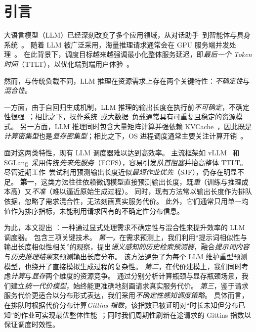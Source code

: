 \section{引言}
\label{sec:intro}

大语言模型（LLM）已经深刻改变了多个应用领域，从对话助手~\cite{openai_chatgpt,deepseek}到智能体与具身系统~\cite{chen2023typefly,wang2024llm}。
随着 LLM 被广泛采用，海量推理请求通常会在 GPU 服务端并发处理~\cite{sun2024llumnix}。
在此背景下，调度目标越来越强调最小化整体服务延迟，即\emph{最后一个 Token 时间}（TTLT），以优化端到端用户体验~\cite{shahout2024don,qiu2024efficient}。

然而，与传统负载不同，LLM 推理在资源需求上存在两个关键特性：\emph{不确定性}与\emph{混合性}。

一方面，由于自回归生成机制，LLM 推理的输出长度在执行前\emph{不可确定}，不确定性很强~\cite{yu2022orca}；相比之下，操作系统~\cite{lozi2016linux}或大数据~\cite{ousterhout2015making}负载通常具有可重复且稳定的资源模式。
另一方面，LLM 推理同时包含大量矩阵计算并强依赖 KVCache~\cite{qin2024mooncake}，因此既是\emph{计算密集型}也是\emph{显存密集型}；相比之下，OS 进程调度通常主要关注计算开销~\cite{abrossimov1989generic}。

面对这两类特性，现有 LLM 调度器难以达到高效率。
主流框架如 vLLM~\cite{kwon2023efficient} 和 SGLang~\cite{zheng2024sglang}采用传统\emph{先来先服务}（FCFS），容易引发\emph{队首阻塞}并抬高整体 TTLT。
尽管近期工作~\cite{shahout2024don,qiu2024efficient,fu2024efficient}尝试利用预测输出长度近似\emph{最短作业优先}（SJF），仍存在明显不足。
\textbf{第一}，这类方法往往依赖微调模型直接预测输出长度，既\emph{重}（训练与推理成本高）又\emph{不准}（难以逼近原始生成过程）。
同时，现有方法常以输出长度作为排队依据，忽略了需求混合性，无法刻画真实服务代价。
此外，它们通常只用单一均值作为排序指标，未能利用请求固有的不确定性分布信息。

为此，本文提出 \oursched：一种通过显式处理需求不确定性与混合性来提升效率的 LLM 调度器。
\oursched 包含三项关键技术。
\emph{第一}，在需求预测上，我们利用“提示词相似性与输出长度相似性相关”的观察，提出\emph{语义感知的历史检索预测器}，融合\emph{提示词内容}与\emph{历史推理结果}来预测输出长度分布。
该方法避免了为每个 LLM 维护重型预测模型，也绕开了直接模拟生成过程的复杂性。
\emph{第二}，在代价建模上，我们同时考虑\emph{计算}与\emph{显存}两个维度的资源竞争。
通过分别分析计算瓶颈与显存瓶颈场景，我们建立\emph{统一代价模型}，始终能更准确地刻画请求真实服务代价。
\emph{第三}，鉴于请求服务代价更适合以分布形式表达，我们采用\emph{不确定性感知调度策略}。
具体而言，在排队时根据代价分布计算\emph{Gittins 指数}，该指数已被证明对“时长未知但分布已知”的作业可实现最优整体性能~\cite{gittins1979bandit}；同时我们周期性刷新在途请求的 Gittins 指数以保证调度时效性。

